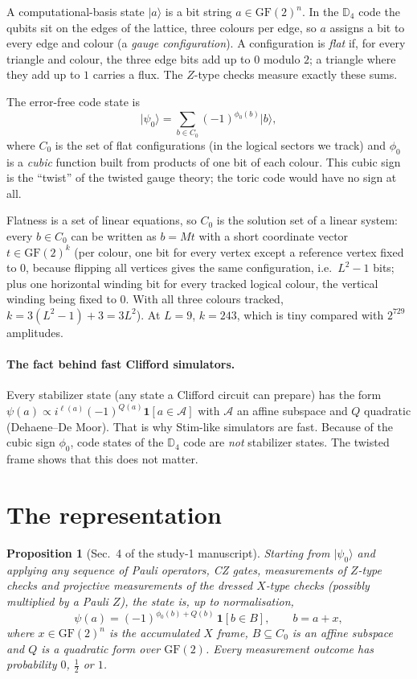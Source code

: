 \documentclass[11pt,a4paper]{article}
\newcommand{\GF}{\mathrm{GF}(2)}
\newcommand{\ind}{\mathbf{1}}
\providecommand{\ket}[1]{\ensuremath{|#1\rangle}}
\newtheorem*{prop}{Proposition}
\begin{document}
A computational-basis state $\ket{a}$ is a bit string $a\in\GF^n$. In the $\mathbb{D}_4$ code the qubits sit on the edges of the lattice, three colours per edge, so $a$ assigns a bit to every edge and colour (a \emph{gauge configuration}). A configuration is \emph{flat} if, for every triangle and colour, the three edge bits add up to $0$ modulo $2$; a triangle where they add up to $1$ carries a flux. The $Z$-type checks measure exactly these sums.

The error-free code state is
\begin{equation}
\ket{\psi_0}=\sum_{b\in C_0}(-1)^{\phi_0(b)}\ket{b},
\label{eq:code}
\end{equation}
where $C_0$ is the set of flat configurations (in the logical sectors we track) and $\phi_0$ is a \emph{cubic} function built from products of one bit of each colour. This cubic sign is the ``twist'' of the twisted gauge theory; the toric code would have no sign at all.

Flatness is a set of linear equations, so $C_0$ is the solution set of a linear system: every $b\in C_0$ can be written as $b=Mt$ with a short coordinate vector $t\in\GF^k$ (per colour, one bit for every vertex except a reference vertex fixed to $0$, because flipping all vertices gives the same configuration, i.e.\ $L^2-1$ bits; plus one horizontal winding bit for every tracked logical colour, the vertical winding being fixed to $0$. With all three colours tracked, $k=3(L^2-1)+3=3L^2$). At $L=9$, $k=243$, which is tiny compared with $2^{729}$ amplitudes.

\paragraph{The fact behind fast Clifford simulators.} Every stabilizer state (any state a Clifford circuit can prepare) has the form $\psi(a)\propto i^{\ell(a)}(-1)^{Q(a)}\ind[a\in\mathcal{A}]$ with $\mathcal{A}$ an affine subspace and $Q$ quadratic (Dehaene--De Moor). That is why Stim-like simulators are fast. Because of the cubic sign $\phi_0$, code states of the $\mathbb{D}_4$ code are \emph{not} stabilizer states. The twisted frame shows that this does not matter.

\section{The representation}

\begin{prop}[Sec.~4 of the study-1 manuscript]
Starting from $\ket{\psi_0}$ and applying any sequence of Pauli operators, CZ gates, measurements of $Z$-type checks and projective measurements of the dressed $X$-type checks (possibly multiplied by a Pauli $Z$), the state is, up to normalisation,
\begin{equation}
\psi(a)=(-1)^{\phi_0(b)+Q(b)}\,\ind[b\in B],\qquad b=a+x,
\label{eq:tf}
\end{equation}
where $x\in\GF^n$ is the accumulated $X$ frame, $B\subseteq C_0$ is an affine subspace and $Q$ is a quadratic form over $\GF$. Every measurement outcome has probability $0$, $\tfrac12$ or $1$.
\end{prop}
\end{document}
